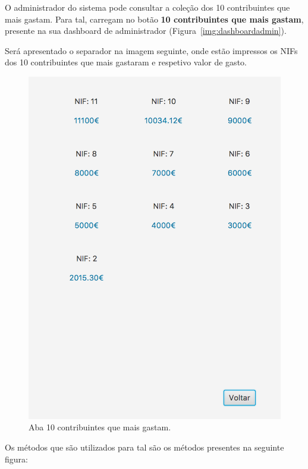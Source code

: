 \documentclass[a4paper]{article}
\begin{document}
\begin{itemize}
O administrador do sistema pode consultar a coleção dos 10 contribuintes
que mais gastam. Para tal, carregam no botão \textbf{10 contribuintes que mais gastam},
presente na sua dashboard de administrador (Figura~\ref{img:dashboardadmin}).

Será apresentado o separador na imagem seguinte, onde estão impressos os NIFs
dos 10 contribuintes que mais gastaram e respetivo valor de gasto.

\begin{figure}[H]
\centering
\includegraphics[scale=0.35]{imgs/10contribuintesScreen.png}
\caption{Aba 10 contribuintes que mais gastam.}
\label{img:10contribuintesScreen}
\end{figure}

Os métodos que são utilizados para tal são os métodos presentes na seguinte
figura:


\end{itemize}
\end{document}
